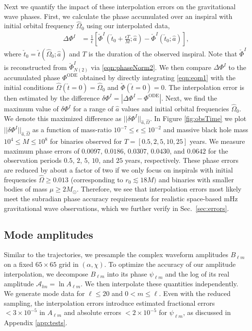 \documentclass[%
 reprint,
 nofootinbib,
 amsmath,amssymb,
 aps,
 prd,
]{revtex4-2}
\begin{document}
Next we quantify the impact of these interpolation errors on the gravitational wave phases.  First, we calculate the phase accumulated over an inspiral with initial orbital frequency $\hat{\Omega}_0$ using our interpolated data,
\begin{align}
    \Delta \Phi^I &= \frac{1}{\epsilon}\left[\check{\Phi}^I\left(\check{t}_0 + \frac{\epsilon T}{M}; \hat{a} \right) - \check{\Phi}^I\left(\check{t}_0; \hat{a}\right) \right],
\end{align}
where $\check{t}_0 = \check{t}(\hat{\Omega}_0; \hat{a})$ and $T$ is the duration of the observed inspiral. Note that $\check{\Phi}^I$ is reconstructed from $\check{\Phi}^I_{N(2)}$ via \eqref{eqn:phaseNorm2}. We then compare $\Delta \Phi^I$ to the accumulated phase $\Phi^\mathrm{ODE}$ obtained by directly integrating \eqref{eqn:eom1} with the initial conditions $\hat{\Omega}(\check{t}=0) = \hat{\Omega}_0$ and $\check{\Phi}(\check{t}=0) = 0$. The interpolation error is then estimated by the difference $\delta \Phi^I = |\Delta\Phi^I - \Phi^\mathrm{ODE}|$. Next, we find the maximum value of $\delta \Phi^I$ for a range of $\hat{a}$ values and initial orbital frequencies $\hat{\Omega}_0$. We denote this maximized difference as $||\delta \Phi^I||_{\hat{a},\hat{\Omega}}$. In Figure \ref{fig:obsTime} we plot $||\delta \Phi^I||_{\hat{a},\hat{\Omega}}$ as a function of mass-ratio $10^{-7} \leq \epsilon \leq 10^{-2}$ and massive black hole mass $10^{4} \leq M \leq 10^{8}$ for binaries observed for $T = [0.5, 2, 5, 10, 25]$ years. We measure maximum phase errors of $0.0097$, $0.0186$, $0.0307$, $0.0430$, and $0.0642$ for the observation periods $0.5$, $2$, $5$, $10$, and $25$ years, respectively. These phase errors are reduced by about a factor of two if we only focus on inspirals with initial frequencies $\hat{\Omega} \geq 0.013$ (corresponding to $r_0 \lesssim 18 M)$ and binaries with smaller bodies of mass $\mu \geq 2 M_\odot$. Therefore, we see that interpolation errors most likely meet the subradian phase accuracy requirements for realistic space-based mHz gravitational wave observations, which we further verify in Sec.~\ref{sec:errors}.

\subsection{Mode amplitudes}
\label{sec:amp}

Similar to the trajectories, we presample the complex waveform amplitudes $B_{\ell m}$ on a fixed $65 \times 65$ grid in $(\alpha, \chi)$. To optimize the accuracy of our amplitude interpolation, we decompose $B_{\ell m}$ into its phase $\psi_{\ell m}$ and the log of its real amplitude $\mathcal{A}_{lm} = \ln A_{\ell m}$. We then interpolate these quantities independently. We generate mode data for $\ell \leq 20$ and $0 < m \leq \ell$. Even with the reduced sampling, the interpolation errors introduce estimated fractional errors $< 3\times 10^{-5}$ in $A_{\ell m}$ and absolute errors $<2 \times 10^{-5}$ for $\psi_{\ell m}$, as discussed in Appendix \ref{app:tests}.
\end{document}
